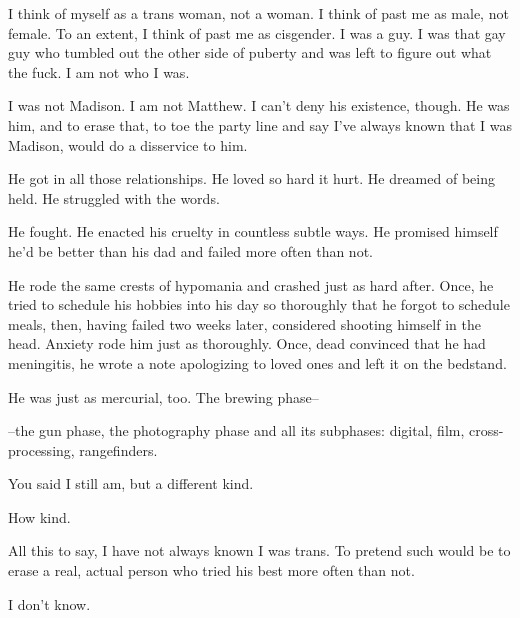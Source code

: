 I think of myself as a trans woman, not a woman. I think of past me as male, not female. To an extent, I think of past me as cisgender. I was a guy. I was that gay guy who tumbled out the other side of puberty and was left to figure out what the fuck. I am not who I was.


I was not Madison. I am not Matthew. I can't deny his existence, though. He was him, and to erase that, to toe the party line and say I've always known that I was Madison, would do a disservice to him.

He got in all those relationships. He loved so hard it hurt. He dreamed of being held. He struggled with the words.

He fought. He enacted his cruelty in countless subtle ways. He promised himself he'd be better than his dad and failed more often than not.

He rode the same crests of hypomania and crashed just as hard after. Once, he tried to schedule his hobbies into his day so thoroughly that he forgot to schedule meals, then, having failed two weeks later, considered shooting himself in the head. Anxiety rode him just as thoroughly. Once, dead convinced that he had meningitis, he wrote a note apologizing to loved ones and left it on the bedstand.

He was just as mercurial, too. The brewing phase--


--the gun phase, the photography phase and all its subphases: digital, film, cross-processing, rangefinders.


You said I still am, but a different kind.


How kind.

All this to say, I have not always known I was trans. To pretend such would be to erase a real, actual person who tried his best more often than not.


I don't know.

\newpage
